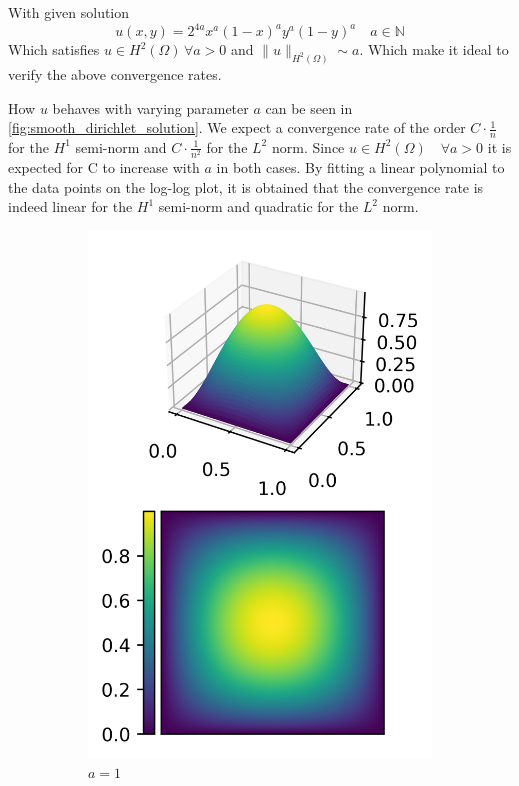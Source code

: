\documentclass[11pt,a4paper]{article}
\begin{document}
With given solution
$$ u(x,y) = 2^{4a} x^a (1-x)^a y^a (1-y)^a \quad a \in \mathbb{N} $$
Which satisfies $u \in H^2(\Omega)\,\forall a > 0$
and $\lVert u \rVert_{H^2(\Omega)} \sim a$.
Which make it ideal to verify the above convergence rates.

How $u$ behaves with varying parameter $a$ can be seen in \ref{fig:smooth_dirichlet_solution}.
We expect a convergence rate of the order $C\cdot\frac{1}{n}$ for the $H^1$ semi-norm
and $C\cdot\frac{1}{n^2}$ for the $L^2$ norm.
Since $u \in H^2(\Omega) \quad \forall a > 0$ it is expected for C to increase
with $a$ in both cases.
By fitting a linear polynomial to the data points on the log-log plot, it is obtained that the
convergence rate is indeed linear for the $H^1$ semi-norm and quadratic for the $L^2$ norm.

\begin{figure}
  \centering
  \begin{subfigure}{.5\textwidth}
    \centering
    \includegraphics[width=.6\linewidth]{contour_1}
    \caption{$a = 1$}
  \end{subfigure}%
  \begin{subfigure}{.5\textwidth}
    \centering

\end{subfigure}
\end{figure}
\end{document}
